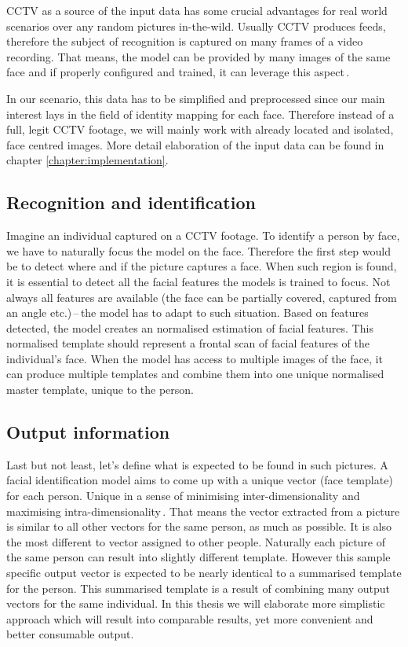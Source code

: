CCTV as a source of the input data has some crucial advantages for real world scenarios over any random pictures in-the-wild. Usually CCTV produces feeds, therefore the subject of recognition is captured on many frames of a video recording. That means, the model can be provided by many images of the same face and if properly configured and trained, it can leverage this aspect\,\cite{biometricguide}.

In our scenario, this data has to be simplified and preprocessed since our main interest lays in the field of identity mapping for each face. Therefore instead of a full, legit CCTV footage, we will mainly work with already located and isolated, face centred images. More detail elaboration of the input data can be found in chapter \ref{chapter:implementation}.

\subsection{Recognition and identification}

Imagine an individual captured on a CCTV footage. To identify a person by face, we have to naturally focus the model on the face. Therefore the first step would be to detect where and if the picture captures a face. When such region is found, it is essential to detect all the facial features the models is trained to focus. Not always all features are available (the face can be partially covered, captured from an angle etc.)\,--\,the model has to adapt to such situation. Based on features detected, the model creates an normalised estimation of facial features. This normalised template should represent a frontal scan of facial features of the individual's face. When the model has access to multiple images of the face, it can produce multiple templates and combine them into one unique normalised master template, unique to the person.

\subsection{Output information}

Last but not least, let's define what is expected to be found in such pictures. A facial identification model aims to come up with a unique vector (face template) for each person. Unique in a sense of minimising inter-dimensionality and maximising intra-dimensionality\,\cite{jain2000biometric}. That means the vector extracted from a picture is similar to all other vectors for the same person, as much as possible. It is also the most different to vector assigned to other people. Naturally each picture of the same person can result into slightly different template. However this sample specific output vector is expected to be nearly identical to a summarised template for the person. This summarised template is a result of combining many output vectors for the same individual. In this thesis we will elaborate more simplistic approach which will result into comparable results, yet more convenient and better consumable output.
